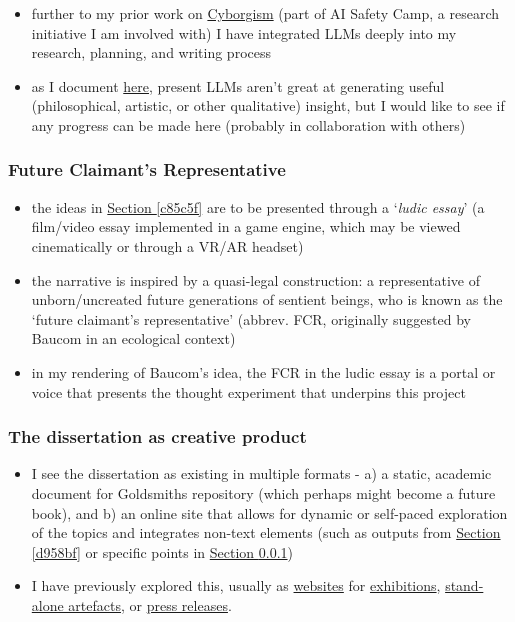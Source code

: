\documentclass{article}
\begin{document}
\label{d958bf}

\begin{itemize}
\item further to my prior work on \href{https://www.lesswrong.com/posts/iFBdEqEogtXcjCPBB/the-compleat-cybornaut}{Cyborgism} (part of AI Safety Camp, a research initiative I am involved with) I have integrated LLMs deeply into my research, planning, and writing process
\item as I document \href{https://www.lesswrong.com/posts/k93NEoXZq6CdXegdx/philosophical-cyborg-part-1}{here}, present LLMs aren't great at generating useful (philosophical, artistic, or other qualitative) insight, but I would like to see if any progress can be made here (probably in collaboration with others)
\end{itemize}

\subsubsection{Future Claimant's Representative}

\label{c11478}

\begin{itemize}
\item the ideas in \hyperref[c85c5f]{Section \ref*{c85c5f}}  are to be presented through a `\textit{ludic essay}' (a film/video essay implemented in a game engine, which may be viewed cinematically or through a VR/AR headset)
\item the narrative is inspired by a quasi-legal construction: a representative of unborn/uncreated future generations of sentient beings, who is known as the `future claimant's representative' (abbrev. FCR, originally suggested by Baucom in an ecological context)
\item in my rendering of Baucom's idea, the FCR in the ludic essay is a portal or voice that presents the thought experiment that underpins this project
\end{itemize}

\subsubsection{The dissertation as creative product}

\begin{itemize}
\item I see the dissertation as existing in multiple formats - a) a static, academic document for Goldsmiths repository (which perhaps might become a future book), and b) an online site that allows for dynamic or self-paced exploration of the topics and integrates non-text elements (such as outputs from \hyperref[d958bf]{Section \ref*{d958bf}} or specific points in \hyperref[c11478]{Section \ref*{c11478}})
\item I have previously explored this, usually as \href{http://ukc10014.org/media/qm_2018-master/index.html}{websites} for \href{https://ukc10014.github.io/neu/}{exhibitions}, \href{http://airo-ne.org/site/home.html}{stand-alone artefacts}, or \href{https://www.artistsallianceinc.org/wp-content/uploads/2020/11/calling@sweeneyshoal_pr_rr_110620.pdf}{press releases}.
\end{itemize}
\end{document}
